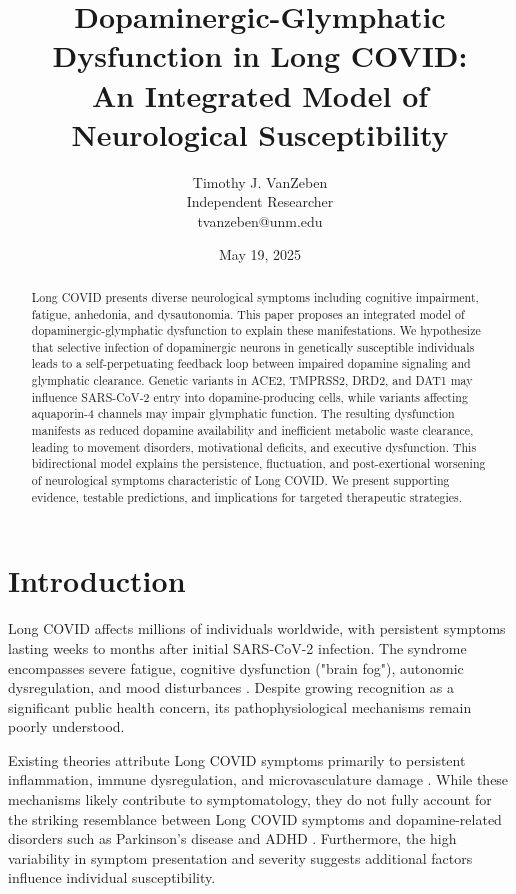 \documentclass[12pt]{article}
\title{Dopaminergic-Glymphatic Dysfunction in Long COVID: \\ An Integrated Model of Neurological Susceptibility}
\author{Timothy J. VanZeben \\ Independent Researcher \\ tvanzeben@unm.edu}
\date{May 19, 2025}
\begin{document}
\maketitle

\begin{abstract}
Long COVID presents diverse neurological symptoms including cognitive impairment, fatigue, anhedonia, and dysautonomia. This paper proposes an integrated model of dopaminergic-glymphatic dysfunction to explain these manifestations. We hypothesize that selective infection of dopaminergic neurons in genetically susceptible individuals leads to a self-perpetuating feedback loop between impaired dopamine signaling and glymphatic clearance. Genetic variants in ACE2, TMPRSS2, DRD2, and DAT1 may influence SARS-CoV-2 entry into dopamine-producing cells, while variants affecting aquaporin-4 channels may impair glymphatic function. The resulting dysfunction manifests as reduced dopamine availability and inefficient metabolic waste clearance, leading to movement disorders, motivational deficits, and executive dysfunction. This bidirectional model explains the persistence, fluctuation, and post-exertional worsening of neurological symptoms characteristic of Long COVID. We present supporting evidence, testable predictions, and implications for targeted therapeutic strategies.
\end{abstract}

\section{Introduction}

Long COVID affects millions of individuals worldwide, with persistent symptoms lasting weeks to months after initial SARS-CoV-2 infection. The syndrome encompasses severe fatigue, cognitive dysfunction ("brain fog"), autonomic dysregulation, and mood disturbances \citep{Davis2021}. Despite growing recognition as a significant public health concern, its pathophysiological mechanisms remain poorly understood.

Existing theories attribute Long COVID symptoms primarily to persistent inflammation, immune dysregulation, and microvasculature damage \citep{Yang2021, Crunfli2023}. While these mechanisms likely contribute to symptomatology, they do not fully account for the striking resemblance between Long COVID symptoms and dopamine-related disorders such as Parkinson's disease and ADHD \citep{Devine2022, Gizer2009}. Furthermore, the high variability in symptom presentation and severity suggests additional factors influence individual susceptibility.
\end{document}
